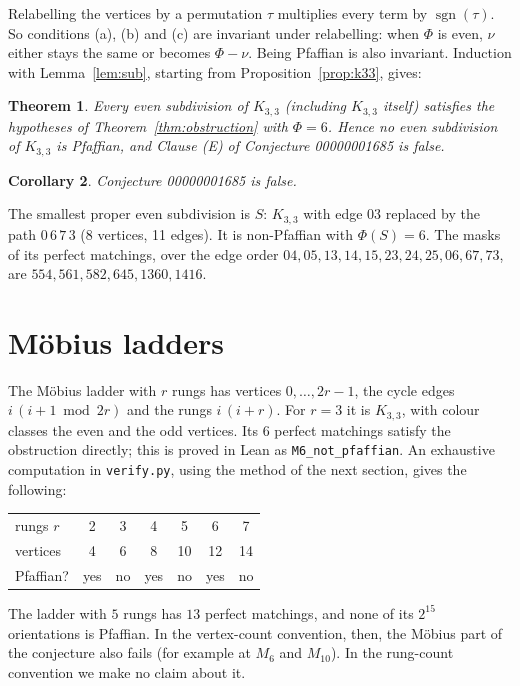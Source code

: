 \documentclass[11pt]{article}
\newtheorem{theorem}{Theorem}
\newtheorem{corollary}[theorem]{Corollary}
\theoremstyle{definition}
\theoremstyle{remark}
\begin{document}
Relabelling the vertices by a permutation $\tau$ multiplies every term by
$\operatorname{sgn}(\tau)$. So conditions (a), (b) and (c) are invariant under
relabelling: when $\Phi$ is even, $\nu$ either stays the same or becomes $\Phi-\nu$.
Being Pfaffian is also invariant. Induction with Lemma~\ref{lem:sub}, starting from
Proposition~\ref{prop:k33}, gives:

\begin{theorem}\label{thm:main}
Every even subdivision of $K_{3,3}$ (including $K_{3,3}$ itself) satisfies the
hypotheses of Theorem~\ref{thm:obstruction} with $\Phi=6$. Hence no even subdivision
of $K_{3,3}$ is Pfaffian, and Clause (E) of Conjecture 00000001685 is false.
\end{theorem}

\begin{corollary}
Conjecture 00000001685 is false.
\end{corollary}

The smallest proper even subdivision is $S$: $K_{3,3}$ with edge $03$ replaced by
the path $0\,6\,7\,3$ (8 vertices, 11 edges). It is non-Pfaffian with
$\Phi(S)=6$. The masks of its perfect matchings, over the edge order
$04,05,13,14,15,23,24,25,06,67,73$, are $554,561,582,645,1360,1416$.

\section{M\"obius ladders}
The M\"obius ladder with $r$ rungs has vertices $0,\dots,2r-1$, the cycle edges
$i\,(i+1 \bmod 2r)$ and the rungs $i\,(i+r)$. For $r=3$ it is $K_{3,3}$, with colour
classes the even and the odd vertices. Its $6$ perfect matchings satisfy the
obstruction directly; this is proved in Lean as \texttt{M6\_not\_pfaffian}. An
exhaustive computation in \texttt{verify.py}, using the method of the next section,
gives the following:
\begin{center}
\begin{tabular}{lcccccc}
\toprule
rungs $r$ & 2 & 3 & 4 & 5 & 6 & 7\\
vertices & 4 & 6 & 8 & 10 & 12 & 14\\
Pfaffian? & yes & no & yes & no & yes & no\\
\bottomrule
\end{tabular}
\end{center}
The ladder with $5$ rungs has $13$ perfect matchings, and none of its $2^{15}$
orientations is Pfaffian. In the vertex-count convention, then, the M\"obius part
of the conjecture also fails (for example at $M_6$ and $M_{10}$). In the rung-count
convention we make no claim about it.
\end{document}
